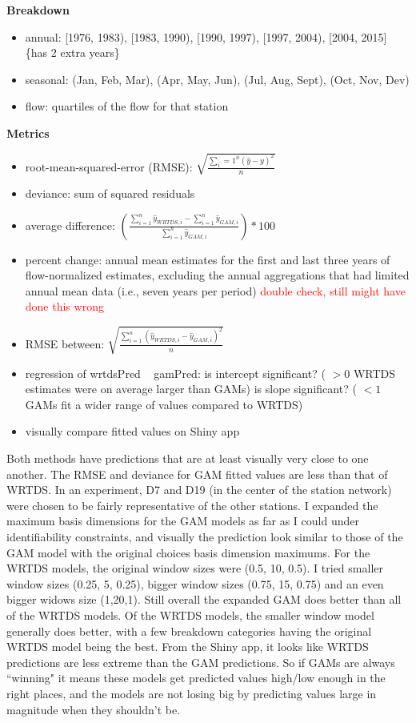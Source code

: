 \documentclass[12pt]{amsart}
\begin{document}
\textbf{Breakdown}
\begin{itemize}
\item annual: [1976, 1983), [1983, 1990), [1990, 1997), [1997, 2004), [2004, 2015] \{has 2 extra years\}
\item seasonal: (Jan, Feb, Mar), (Apr, May, Jun), (Jul, Aug, Sept), (Oct, Nov, Dev)
\item flow: quartiles of the flow for that station
\end{itemize}

\textbf{Metrics}
\begin{itemize}
\item root-mean-squared-error (RMSE): $\sqrt{\frac{\sum_{i}=1^n (\hat{y}-y)^2}{n}}$
\item deviance: sum of squared residuals
\item average difference: $\left(\frac{\sum_{i=1}^n \hat{y}_{WRTDS,i}-\sum_{i=1}^n \hat{y}_{GAM,i}}{\sum_{i=1}^n \hat{y}_{GAM,i}}\right)*100$
\item percent change: annual mean estimates for the first and last three years of flow-normalized estimates, excluding the annual aggregations that had limited annual mean data (i.e., seven years per period) \textcolor{red}{double check, still might have done this wrong}
\item RMSE between: $\sqrt{\frac{\sum_{i=1}^n (\hat{y}_{WRTDS,i}-\hat{y}_{GAM,i})^2}{n}}$
\item regression of wrtdsPred ~ gamPred: is intercept significant? ( $>0$ WRTDS estimates were on average larger than GAMs) is slope significant? ( $<1$ GAMs fit a wider range of values compared to WRTDS)
\item visually compare fitted values on Shiny app
\end{itemize}



Both methods have predictions that are at least visually very close to one another.
The RMSE and deviance for GAM fitted values are less than that of WRTDS. In an experiment, D7 and D19 (in the center of the station network) were chosen to be fairly representative of the other stations. I expanded the maximum basis dimensions for the GAM models as far as I could under identifiability constraints, and visually the prediction look similar to those of the GAM model with the original choices basis dimension maximums. For the WRTDS models, the original window sizes were (0.5, 10, 0.5). I tried smaller window sizes (0.25, 5, 0.25), bigger window sizes (0.75, 15, 0.75) and an even bigger widows size (1,20,1). Still overall the expanded GAM does better than all of the WRTDS models. Of the WRTDS models, the smaller window model generally does better, with a few breakdown categories having the original WRTDS model being the best. From the Shiny app, it looks like WRTDS predictions are less extreme than the GAM predictions. So if GAMs are always ``winning" it means these models get predicted values high/low enough in the right places, and the models are not losing big by predicting values large in magnitude when they shouldn't be.
\end{document}
